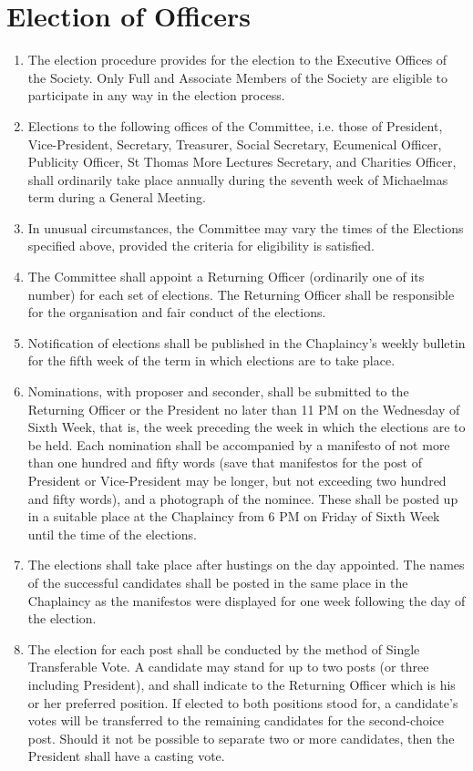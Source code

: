 \documentclass[11pt]{article}
\begin{document}
\section{Election of Officers}
\begin{enumerate}
\item The election procedure provides for the election to the Executive Offices of the Society. Only Full and Associate Members of the Society are eligible to participate in any way in the election process.
\item Elections to the following offices of the Committee, i.e. those of President, Vice-President, Secretary, Treasurer, Social Secretary, Ecumenical Officer, Publicity Officer, St Thomas More Lectures Secretary, and Charities Officer, shall ordinarily take place annually during the seventh week of Michaelmas term during a General Meeting.
\item In unusual circumstances, the Committee may vary the times of the Elections specified above, provided the criteria for eligibility is satisfied.
\item The Committee shall appoint a Returning Officer (ordinarily one of its number) for each set of elections. The Returning Officer shall be responsible for the organisation and fair conduct of the elections.
\item Notification of elections shall be published in the Chaplaincy's weekly bulletin for the fifth week of the term in which elections are to take place.
\item Nominations, with proposer and seconder, shall be submitted to the Returning Officer or the President no later than 11 PM on the Wednesday of Sixth Week, that is, the week preceding the week in which the elections are to be held. Each nomination shall be accompanied by a manifesto of not more than one hundred and fifty words (save that manifestos for the post of President or Vice-President may be longer, but not exceeding two hundred and fifty words), and a photograph of the nominee. These shall be posted up in a suitable place at the Chaplaincy from 6 PM on Friday of Sixth Week until the time of the elections.
\item The elections shall take place after hustings on the day appointed. The names of the successful candidates shall be posted in the same place in the Chaplaincy as the manifestos were displayed for one week following the day of the election.
\item The election for each post shall be conducted by the method of Single Transferable Vote. A candidate may stand for up to two posts (or three including President), and shall indicate to the Returning Officer which is his or her preferred position. If elected to both positions stood for, a candidate's votes will be transferred to the remaining candidates for the second-choice post. Should it not be possible to separate two or more candidates, then the President shall have a casting vote.

\end{enumerate}
\end{document}
